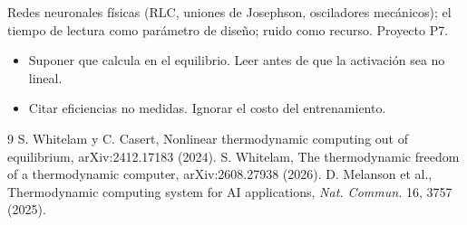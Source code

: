 \documentclass[11pt,a4paper]{article}
\begin{document}
\begin{aplicacion}
Redes neuronales físicas (RLC, uniones de Josephson, osciladores mecánicos); el tiempo de lectura como parámetro de diseño; ruido como recurso. Proyecto P7.
\end{aplicacion}

\begin{error}
\begin{itemize}[nosep]
\item Suponer que calcula en el equilibrio. \quad Leer antes de que la activación sea no lineal.
\item Citar eficiencias no medidas. \quad Ignorar el costo del entrenamiento.
\end{itemize}
\end{error}

\begin{thebibliography}{9}\small
{} S. Whitelam y C. Casert, Nonlinear thermodynamic computing out of equilibrium, arXiv:2412.17183 (2024).
 S. Whitelam, The thermodynamic freedom of a thermodynamic computer, arXiv:2608.27938 (2026).
 D. Melanson et al., Thermodynamic computing system for AI applications, \emph{Nat. Commun.} 16, 3757 (2025).
\end{thebibliography}
\end{document}
